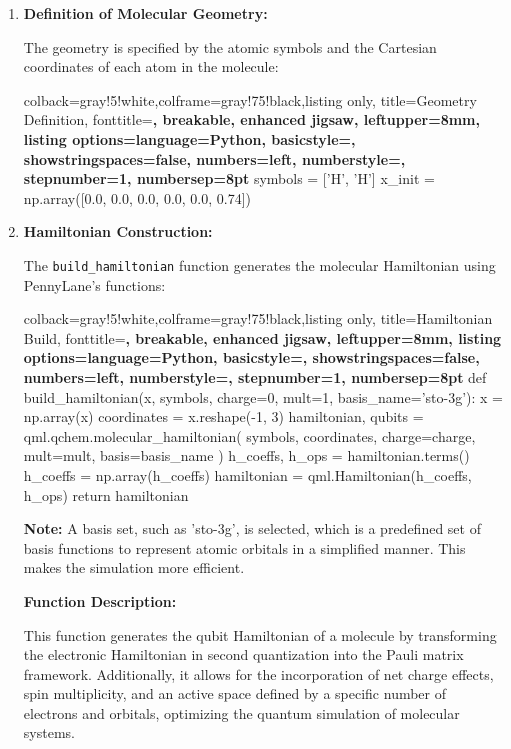\begin{enumerate}
    \item \textbf{Definition of Molecular Geometry:}
    
    The geometry is specified by the atomic symbols and the Cartesian coordinates of each atom in the molecule:
    
    \begin{tcblisting}{colback=gray!5!white,colframe=gray!75!black,listing only,
      title=Geometry Definition, fonttitle=\bfseries, breakable, enhanced jigsaw, leftupper=8mm,
      listing options={language=Python, basicstyle=\ttfamily\small,
      showstringspaces=false, numbers=left, numberstyle=\footnotesize, stepnumber=1, numbersep=8pt}}
symbols = ['H', 'H']
x_init = np.array([0.0, 0.0, 0.0, 0.0, 0.0, 0.74]) 
    \end{tcblisting}
    
    
    \item \textbf{Hamiltonian Construction:}
    
    The \texttt{build\_hamiltonian} function generates the molecular Hamiltonian using PennyLane's functions:
    
    \begin{tcblisting}{colback=gray!5!white,colframe=gray!75!black,listing only,
      title=Hamiltonian Build, fonttitle=\bfseries, breakable, enhanced jigsaw, leftupper=8mm,
      listing options={language=Python, basicstyle=\ttfamily\small,
      showstringspaces=false, numbers=left, numberstyle=\footnotesize, stepnumber=1, numbersep=8pt}}
def build_hamiltonian(x, symbols, charge=0, mult=1, basis_name='sto-3g'):
    x = np.array(x)
    coordinates = x.reshape(-1, 3)
    hamiltonian, qubits = qml.qchem.molecular_hamiltonian(
        symbols, coordinates, charge=charge, mult=mult, basis=basis_name
    )
    h_coeffs, h_ops = hamiltonian.terms()
    h_coeffs = np.array(h_coeffs)
    hamiltonian = qml.Hamiltonian(h_coeffs, h_ops)
    return hamiltonian
    \end{tcblisting}
    \textbf{Note:}
    A basis set, such as 'sto-3g', is selected, which is a predefined set of basis functions to represent atomic orbitals in a simplified manner. This makes the simulation more efficient.
    
    \textbf{Function Description:}
    
    This function generates the qubit Hamiltonian of a molecule by transforming the electronic Hamiltonian in second quantization into the Pauli matrix framework. Additionally, it allows for the incorporation of net charge effects, spin multiplicity, and an active space defined by a specific number of electrons and orbitals, optimizing the quantum simulation of molecular systems.
    
\end{enumerate}

